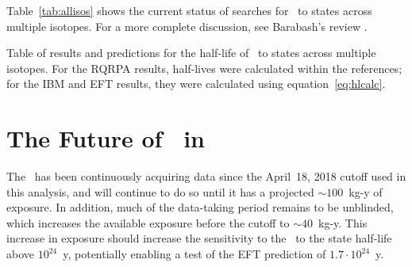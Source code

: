 \documentclass[/main.tex]{subfiles}
\begin{document}
Table~\ref{tab:allisos} shows the current status of searches for \tnbb\ to  states across multiple isotopes.
For a more complete discussion, see Barabash's review \cite{barabash2017}. 
\begin{table}
  \centering
  \caption[Table of \tnbb\ to  states across multiple isotopes]{\label{tab:allisos}
    Table of results and predictions for the half-life of \tnbb\ to  states across multiple isotopes. For the RQRPA results, half-lives were calculated within the references; for the IBM and EFT results, they were calculated using equation~\ref{eq:hlcalc}.
  }
  
\end{table}

\section{The Future of \bbes\ in }
The \MJD\ has been continuously acquiring data since the April~18, 2018 cutoff used in this analysis, and will continue to do so until it has a projected ${\sim}100$~kg-y of exposure.
In addition, much of the data-taking period remains to be unblinded, which increases the available exposure before the cutoff to ${\sim}40$~kg-y.
This increase in exposure should increase the sensitivity to the \bbes\ to the  state half-life above $10^{24}$~y, potentially enabling a test of the EFT prediction of $1.7\cdot10^{24}$~y\cite{menendez2018}.
\end{document}
